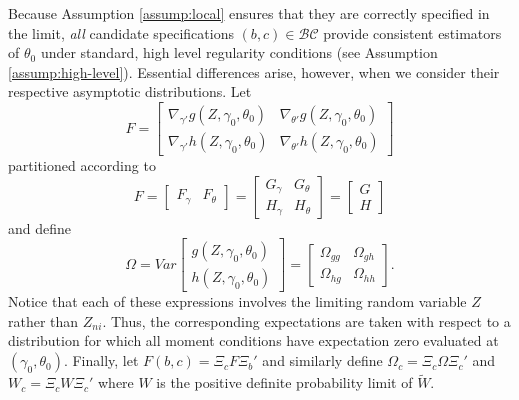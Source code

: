 Because Assumption \ref{assump:local} ensures that they are correctly specified in the limit, \emph{all} candidate specifications $(b,c)\in \mathcal{BC}$ provide consistent estimators of $\theta_0$ under standard, high level regularity conditions (see Assumption \ref{assump:high-level}).
Essential differences arise, however, when we consider their respective asymptotic distributions. 
Let
		\begin{equation}F  =  \left[\begin{array}{cc}  \nabla_{\gamma'}g\left(Z,\gamma_0, \theta_0\right) &   \nabla_{\theta'}g\left(Z,\gamma_0, \theta_0\right) \\
 \nabla_{\gamma'}h\left(Z,\gamma_0, \theta_0\right)  &   \nabla_{\theta'}h\left(Z,\gamma_0, \theta_0\right)  
		 \end{array}\right] 
	\end{equation}
partitioned according to
	\begin{equation}F  = \left[\begin{array}{cc}F_\gamma & F_\theta \end{array}\right] = 
		  \left[\begin{array}{cc} G_\gamma & G_\theta \\
					 H_\gamma& H_\theta
		 \end{array}\right] = \left[\begin{array}{c} G\\ H \end{array}\right]
	\end{equation}
and define
	\begin{equation}
		\Omega = Var\left[ \begin{array}{c} g(Z, \gamma_0, \theta_0) \\ h(Z, \gamma_0, \theta_0) \end{array}\right] =\left[ \begin{array}{cc}\Omega_{gg} & \Omega_{gh}\\ \Omega_{hg}& \Omega_{hh} \end{array} \right].
	\end{equation}
Notice that each of these expressions involves the limiting random variable $Z$ rather than $Z_{ni}$. 
Thus, the corresponding expectations are taken with respect to a distribution for which all moment conditions have expectation zero  evaluated at $(\gamma_0,\theta_0)$.
Finally, let $F(b,c) = \Xi_c F \Xi_b'$ and similarly define $\Omega_c = \Xi_c \Omega \Xi_c'$ and $W_c = \Xi_c W \Xi_c'$ where $W$ is the positive definite probability limit of $\widetilde{W}$. 
